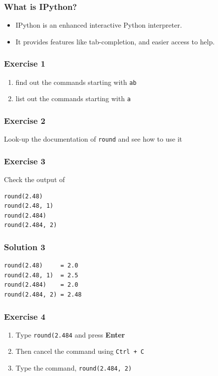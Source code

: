 \documentclass[17pt]{beamer}
\begin{document}
\begin{frame}
\frametitle{What is IPython?}
\begin{itemize}
\item IPython is an enhanced interactive Python interpreter.\pause
\item It provides features like tab-completion, and easier access to help.
\end{itemize}
\end{frame}
\begin{frame}
\frametitle{Exercise 1}
\begin{enumerate}
\item find out the commands starting with \texttt{ab} \pause
\item list out the commands starting with \texttt{a}
\end{enumerate}
\end{frame}
\begin{frame}
\frametitle{Exercise 2}
Look-up the documentation of \texttt{round} and see how to use it
\end{frame}
\begin{frame}[fragile]
\frametitle{Exercise 3}
Check the output of
\lstset{language=Python}
\begin{lstlisting}
round(2.48)
round(2.48, 1)
round(2.484)
round(2.484, 2)
\end{lstlisting}
\end{frame}
\begin{frame}[fragile]
\frametitle{Solution 3}
\lstset{language=Python}
\begin{lstlisting}
round(2.48)     = 2.0
round(2.48, 1)  = 2.5
round(2.484)    = 2.0 
round(2.484, 2) = 2.48
\end{lstlisting}
\end{frame}
\begin{frame}
\frametitle{Exercise 4}
\begin{enumerate}
\item Type \texttt{round(2.484}  and press \textbf{Enter} 
\item Then cancel the command using \texttt{Ctrl + C}\pause
\item Type the command, \texttt{round(2.484, 2)}
\end{enumerate}
\end{frame}
\end{document}
